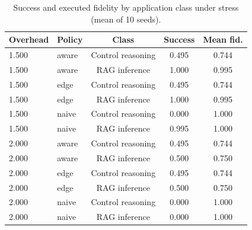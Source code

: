 \begin{table}[t]
\centering
\footnotesize
\caption{Success and executed fidelity by application class under stress (mean of 10 seeds).}
\label{tab:p2-classes}
\begin{tabular}{llccc}
\toprule
Overhead & Policy & Class & Success & Mean fid. \\
\midrule
1.500 & aware & Control reasoning & 0.495 & 0.744 \\
1.500 & aware & RAG inference & 1.000 & 0.995 \\
1.500 & edge & Control reasoning & 0.495 & 0.744 \\
1.500 & edge & RAG inference & 1.000 & 0.995 \\
1.500 & naive & Control reasoning & 0.000 & 1.000 \\
1.500 & naive & RAG inference & 0.995 & 1.000 \\
2.000 & aware & Control reasoning & 0.495 & 0.744 \\
2.000 & aware & RAG inference & 0.500 & 0.750 \\
2.000 & edge & Control reasoning & 0.495 & 0.744 \\
2.000 & edge & RAG inference & 0.500 & 0.750 \\
2.000 & naive & Control reasoning & 0.000 & 1.000 \\
2.000 & naive & RAG inference & 0.000 & 1.000 \\
\bottomrule
\end{tabular}
\par\vspace{2pt}{\footnotesize\raggedright At 1.5x the hard class is the binding one (0.495) while the RAG class is served fully; at 2x both sit near 0.5. Neither class is silently collapsed, so the aggregate does not hide a single failing class.\par}
\end{table}
